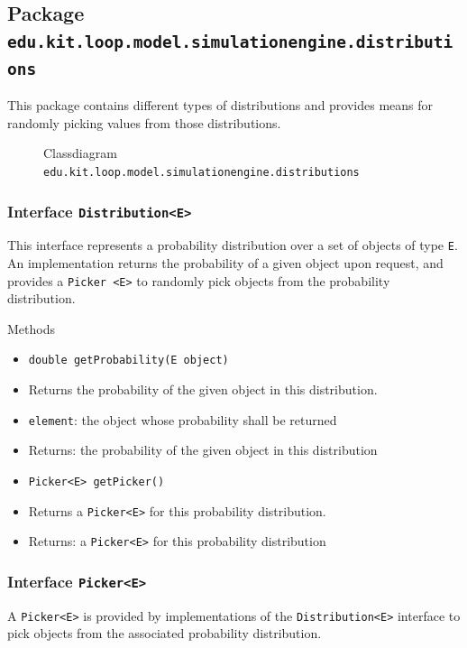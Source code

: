 \documentclass[parskip=full,11pt]{scrartcl}
\begin{document}
\subsection{Package \texttt{edu.kit.loop.model.simulationengine.distributions}}

This package contains different types of distributions and provides means for randomly picking values from those distributions.

\iftrue
\begin{figure}[h]
	\centering
	\fontsize{6}{8}\selectfont
	

	\caption{Classdiagram \texttt{edu.kit.loop.model.simulationengine.distributions}}
\end{figure}
\fi
\subsubsection{Interface \texttt{Distribution<E>}}
This interface represents a probability distribution over a set of objects of type \texttt{E}. An implementation returns the probability of a given object upon request, and provides a \texttt{Picker <E>} to randomly pick objects from the probability distribution.

Methods
\begin{itemize}\itemsep -10pt
\item \texttt{double getProbability(E object)}
\item[] Returns the probability of the given object in this distribution.
\item[] \texttt{element}: the object whose probability shall be returned
\item[] Returns: the probability of the given object in this distribution

\item \texttt{Picker<E> getPicker()}
\item[] Returns a \texttt{Picker<E>} for this probability distribution.
\item[] Returns: a \texttt{Picker<E>} for this probability distribution
\end{itemize}

\subsubsection{Interface \texttt{Picker<E>}}
A \texttt{Picker<E>} is provided by implementations of the \texttt{Distribution<E>} interface to pick objects from the associated probability distribution.
\end{document}

